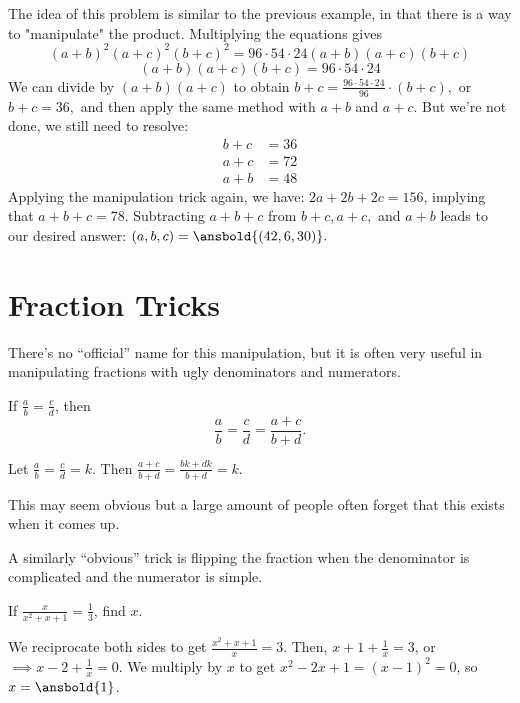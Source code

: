 \documentclass{article}
\begin{document}
\begin{sol}
The idea of this problem is similar to the previous example, in that there is a way to "manipulate" the product. Multiplying the equations gives
\[(a+b)^2(a+c)^2(b+c)^2 = 96 \cdot 54 \cdot 24(a+b)(a+c)(b+c)\]
\[(a+b)(a+c)(b+c)= 96 \cdot 54 \cdot 24\]
We can divide by $(a+b)(a+c)$ to obtain $b+c = \frac{96 \cdot 54 \cdot 24}{96} \cdot (b+c),$ or $b+c = 36,$ and then apply the same method with $a+b$ and $a+c.$ But we're not done, we still need to resolve:
\begin{align*}
b+c &= 36 \\
a+c &= 72\\
a+b &= 48
\end{align*}
Applying the manipulation trick again, we have: $2a +2b+2c = 156$, implying that $a+b+c = 78.$ Subtracting $a+b+c$ from $b+c,a+c,$ and $a+b$ leads to our desired answer: $(a,b,c)=\ansbold{(42,6,30)}.$
\end{sol}

\section{Fraction Tricks}
There's no ``official'' name for this manipulation, but it is often very useful in manipulating fractions with ugly denominators and numerators. 
\begin{theo}
If $\frac{a}{b}=\frac{c}{d}$, then
\[\frac{a}{b}=\frac{c}{d}=\frac{a+c}{b+d}.\]
\end{theo}

\begin{pro}
Let $\frac{a}{b}=\frac{c}{d}=k$. Then $\frac{a+c}{b+d}=\frac{bk+dk}{b+d}=k$.
\end{pro}

This may seem obvious but a large amount of people often forget that this exists when it comes up.

A similarly ``obvious'' trick is flipping the fraction when the denominator is complicated and the numerator is simple.

\begin{exam}[Classic]
If $\frac{x}{x^2+x+1}=\frac{1}{3}$, find $x$.
\end{exam}

\begin{sol}
We reciprocate both sides to get $\frac{x^2+x+1}{x}=3$. Then, $x+1+\frac{1}{x}=3$, or $\implies x-2+\frac{1}{x}=0$. We multiply by $x$ to get $x^2-2x+1=(x-1)^2=0$, so $x=\ansbold{1}$.
\end{sol}
\end{document}
